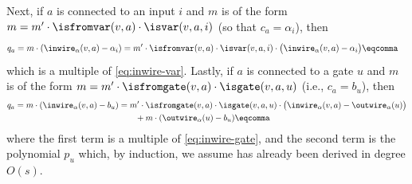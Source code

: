 Next, if $a$ is connected to an input $i$ and $m$ is of the form
$m = m' \cdot \isfromvar(v, a) \cdot \isvar(v, a, i)$ (so that $c_a = \alpha_i$), then
\begin{align}
  q_a = m \cdot (\inwire_{\alpha}(v,a) - \alpha_i) &= m' \cdot \isfromvar(v, a) \cdot \isvar(v, a, i) \cdot
          \big( \inwire_\alpha(v, a) - \alpha_i\big) \eqcomma
\end{align}
which is a multiple of \cref{eq:inwire-var}.  Lastly, if
$a$ is connected to a gate $u$ and $m$ is of the form
$m = m' \cdot \isfromgate(v, a) \cdot \isgate(v, a, u)$ (i.e., $c_a = b_u$), then
\begin{align}
  \nonumber
  q_a = m \cdot(\inwire_\alpha(v,a) - b_u) &= m' \cdot
          \isfromgate(v, a) \cdot \isgate(v, a, u) \cdot
          \big(\inwire_\alpha(v, a) - \outwire_\alpha(u)\big)\\
                                           &\qquad+ m \cdot (\outwire_\alpha(u) - b_u)
                                             \eqcomma
\end{align}
where the first term is a multiple of \cref{eq:inwire-gate}, and the
second term is the polynomial $p_u$ which, by induction, we assume has
already been derived in degree $O(s)$.

